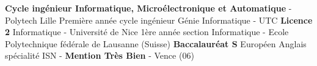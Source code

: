 %
%
%


\begin{scholarship}
					{\textbf{Cycle ingénieur Informatique, Microélectronique et Automatique} - Polytech Lille}
					{Première année cycle ingénieur Génie Informatique - UTC}
					{\textbf{Licence 2} Informatique - Université de Nice}
					{1ère année section Informatique  - Ecole Polytechnique fédérale de Lausanne (Suisse)}
					{\textbf{Baccalauréat S} Européen Anglais spécialité ISN - \textbf{Mention Très Bien} - Vence (06)}
\end{scholarship}
